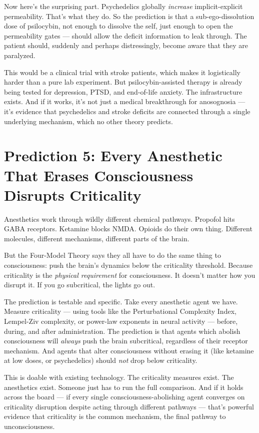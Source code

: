\documentclass[11pt, twoside, openright]{book}
\begin{document}
Now here's the surprising part. Psychedelics globally \textit{increase} implicit-explicit permeability. That's what they do. So the prediction is that a sub-ego-dissolution dose of psilocybin, not enough to dissolve the self, just enough to open the permeability gates --- should allow the deficit information to leak through. The patient should, suddenly and perhaps distressingly, become aware that they are paralyzed.

This would be a clinical trial with stroke patients, which makes it logistically harder than a pure lab experiment. But psilocybin-assisted therapy is already being tested for depression, PTSD, and end-of-life anxiety. The infrastructure exists. And if it works, it's not just a medical breakthrough for anosognosia --- it's evidence that psychedelics and stroke deficits are connected through a single underlying mechanism, which no other theory predicts.

\section*{Prediction 5: Every Anesthetic That Erases Consciousness Disrupts Criticality}

Anesthetics work through wildly different chemical pathways. Propofol hits GABA receptors. Ketamine blocks NMDA. Opioids do their own thing. Different molecules, different mechanisms, different parts of the brain.

But the Four-Model Theory says they all have to do the same thing to consciousness: push the brain's dynamics below the criticality threshold. Because criticality is the \textit{physical requirement} for consciousness. It doesn't matter how you disrupt it. If you go subcritical, the lights go out.

The prediction is testable and specific. Take every anesthetic agent we have. Measure criticality --- using tools like the Perturbational Complexity Index, Lempel-Ziv complexity, or power-law exponents in neural activity --- before, during, and after administration. The prediction is that agents which abolish consciousness will \textit{always} push the brain subcritical, regardless of their receptor mechanism. And agents that alter consciousness without erasing it (like ketamine at low doses, or psychedelics) should \textit{not} drop below criticality.

This is doable with existing technology. The criticality measures exist. The anesthetics exist. Someone just has to run the full comparison. And if it holds across the board --- if every single consciousness-abolishing agent converges on criticality disruption despite acting through different pathways --- that's powerful evidence that criticality is the common mechanism, the final pathway to unconsciousness.
\end{document}
